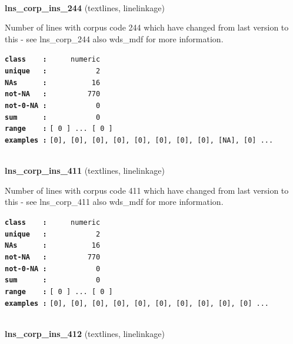 \documentclass[]{article}
\begin{document}
~

\textbf{lns\_corp\_ins\_244} (textlines, linelinkage)

Number of lines with corpus code 244 which have changed from last
version to this - see lns\_corp\_244 also wds\_mdf for more information.

\textbf{\texttt{class\ \ \ \ :}} \texttt{~~~~~numeric}\\
\textbf{\texttt{unique\ \ \ :}} \texttt{~~~~~~~~~~~2}\\
\textbf{\texttt{NAs\ \ \ \ \ \ :}} \texttt{~~~~~~~~~~16}\\
\textbf{\texttt{not-NA\ \ \ :}} \texttt{~~~~~~~~~770}\\
\textbf{\texttt{not-0-NA\ :}} \texttt{~~~~~~~~~~~0}\\
\textbf{\texttt{sum\ \ \ \ \ \ :}} \texttt{~~~~~~~~~~~0}\\
\textbf{\texttt{range\ \ \ \ :}}
\texttt{{[}\ 0\ {]}\ ...\ {[}\ 0\ {]}}\\
\textbf{\texttt{examples\ :}}
\texttt{{[}0{]},\ {[}0{]},\ {[}0{]},\ {[}0{]},\ {[}0{]},\ {[}0{]},\ {[}0{]},\ {[}0{]},\ {[}NA{]},\ {[}0{]}\ ...}\\

~

\textbf{lns\_corp\_ins\_411} (textlines, linelinkage)

Number of lines with corpus code 411 which have changed from last
version to this - see lns\_corp\_411 also wds\_mdf for more information.

\textbf{\texttt{class\ \ \ \ :}} \texttt{~~~~~numeric}\\
\textbf{\texttt{unique\ \ \ :}} \texttt{~~~~~~~~~~~2}\\
\textbf{\texttt{NAs\ \ \ \ \ \ :}} \texttt{~~~~~~~~~~16}\\
\textbf{\texttt{not-NA\ \ \ :}} \texttt{~~~~~~~~~770}\\
\textbf{\texttt{not-0-NA\ :}} \texttt{~~~~~~~~~~~0}\\
\textbf{\texttt{sum\ \ \ \ \ \ :}} \texttt{~~~~~~~~~~~0}\\
\textbf{\texttt{range\ \ \ \ :}}
\texttt{{[}\ 0\ {]}\ ...\ {[}\ 0\ {]}}\\
\textbf{\texttt{examples\ :}}
\texttt{{[}0{]},\ {[}0{]},\ {[}0{]},\ {[}0{]},\ {[}0{]},\ {[}0{]},\ {[}0{]},\ {[}0{]},\ {[}0{]},\ {[}0{]}\ ...}\\

~

\textbf{lns\_corp\_ins\_412} (textlines, linelinkage)
\end{document}

